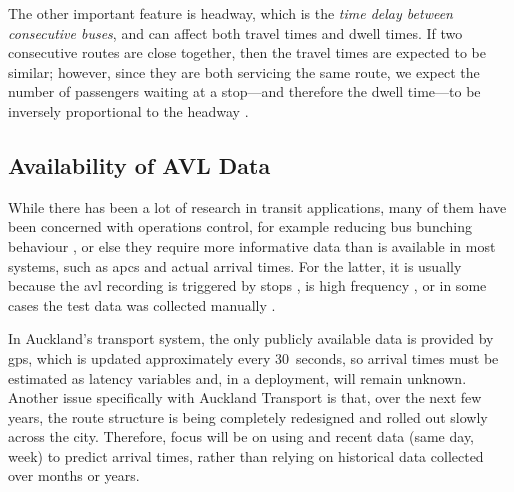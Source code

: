 The other important feature is headway,
which is the \emph{time delay between consecutive buses},
and can affect both travel times and dwell times.
If two consecutive routes are close together,
then the travel times are expected to be similar;
however, since they are both servicing the same route,
we expect the number of passengers waiting at a stop---and therefore
the dwell time---to be inversely proportional to the headway
\citep{Hans_2014,Hans_2015}.




\subsection{Availability of AVL Data}
\label{sec:data-types}

While there has been a lot of research in transit applications,
many of them have been concerned with operations control,
for example reducing bus bunching behaviour \citep{Hans_2015},
or else they require more informative data than is available in most systems,
such as \glspl{apc} and actual arrival times.
For the latter, it is usually because the \gls{avl} recording is triggered by stops
\citep{Hans_2015},
is high frequency \citep{Chang_2010},
or in some cases the test data was collected manually
\citep{Yu_2010}.


In Auckland's transport system, the only publicly available data is provided
by \gls{gps}, which is updated approximately every 30~seconds,
so arrival times must be estimated as latency variables and,
in a \rt{} deployment, will remain unknown.
Another issue specifically with Auckland Transport is that,
over the next few years,
the route structure is being completely redesigned
and rolled out slowly across the city.
Therefore, focus will be on using \rt{} and recent data (same day, week) to predict arrival times,
rather than relying on historical data collected over months or years.


